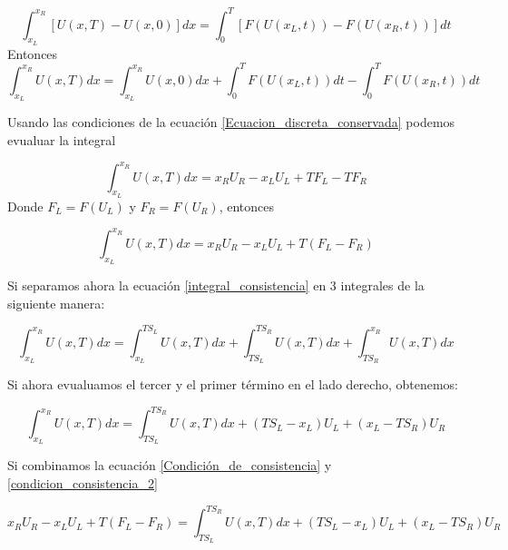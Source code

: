 \documentclass[12pt,a4paper]{book}
\begin{document}
\begin{equation*}\label{Forma_integral_conservadas}
\int_{x_L}^{x_R} \left[ U\left( x, T \right) -
 U\left( x, 0 \right) \right] dx = 
 \int_{0}^{T} \left[ F \left(U\left( x_L, t \right) \right) -
 F \left(U\left( x_R, t \right) \right) \right] dt 
\end{equation*}
Entonces
\begin{equation}\label{integral_consistencia}
\int_{x_L}^{x_R} U\left( x, T \right) dx =\int_{x_L}^{x_R} U\left( x, 0 \right) dx+
\int_{0}^{T}  F \left(U\left( x_L, t \right) \right)dt -
\int_{0}^{T}  F \left(U\left( x_R, t \right) \right) dt
\end{equation}

Usando las condiciones de la ecuación \ref{Ecuacion_discreta_conservada} podemos evualuar la integral

\begin{equation*}
\int_{x_L}^{x_R} U\left( x, T \right) dx = 
x_R U_R -x_L U_L+T F_L-T F_R
\end{equation*}
Donde $F_L = F \left( U_L \right)$ y $F_R = F \left( U_R \right)$, entonces

\begin{equation}\label{Condición_de_consistencia}
\int_{x_L}^{x_R} U\left( x, T \right) dx = 
x_R U_R -x_L U_L+T \left( F_L- F_R \right)
\end{equation}

Si separamos ahora la ecuación \ref{integral_consistencia} en 3 integrales de la siguiente manera:

\begin{equation}
\int_{x_L}^{x_R} U\left( x, T \right) dx = 
\int_{x_L}^{T S_L} U \left(x, T \right)dx+
\int_{T S_L}^{T S_R} U \left(x, T \right)dx+
\int_{T S_R}^{x_R} U \left(x, T \right)dx
\end{equation}

Si ahora evualuamos el tercer y el primer término en el lado derecho, obtenemos:

\begin{equation}\label{condicion_consistencia_2}
\int_{x_L}^{x_R} U\left( x, T \right) dx =
\int_{T S_L}^{T S_R} U \left(x, T \right)dx+
\left( T S_L - x_L \right) U_L+
\left( x_L - T S_R \right) U_R
\end{equation}

Si combinamos la ecuación \ref{Condición_de_consistencia} y 
\ref{condicion_consistencia_2}

\begin{equation*}
x_R U_R -x_L U_L+T \left( F_L- F_R \right) =
\int_{T S_L}^{T S_R} U \left(x, T \right)dx+
\left( T S_L - x_L \right) U_L+
\left( x_L - T S_R \right) U_R
\end{equation*}
\end{document}

